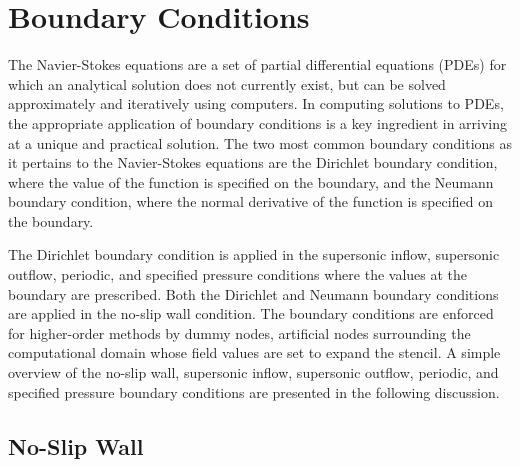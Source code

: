 \section{Boundary Conditions}

The Navier-Stokes equations are a set of partial differential equations (PDEs) for which an analytical solution does not currently exist, but can be solved approximately and iteratively using computers. In computing solutions to PDEs, the appropriate application of boundary conditions is a key ingredient in arriving at a unique and practical solution. The two most common boundary conditions as it pertains to the Navier-Stokes equations are the Dirichlet boundary condition, where the value of the function is specified on the boundary, and the Neumann boundary condition, where the normal derivative of the function is specified on the boundary. 

The Dirichlet boundary condition is applied in the supersonic inflow, supersonic outflow, periodic, and specified pressure conditions where the values at the boundary are prescribed. Both the Dirichlet and Neumann boundary conditions are applied in the no-slip wall condition. The boundary conditions are enforced for higher-order methods by dummy nodes, artificial nodes surrounding the computational domain whose field values are set to expand the stencil. A simple overview of the no-slip wall, supersonic inflow, supersonic outflow, periodic, and specified pressure boundary conditions are presented in the following discussion.

\subsection{No-Slip Wall}

